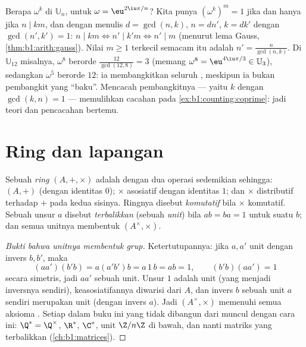 \begin{example}\label{ex:b1:structures:orderU12}
Berapa  $\omega^k$ di $\mathbb U_n$, untuk $\omega =
\eu^{2\iu\pi/n}$? Kita punya $(\omega^k)^m = 1$ jika dan hanya jika $n \mid km$, dan
dengan menulis $d = \gcd(n, k)$, $n = dn'$, $k = dk'$ dengan $\gcd(n', k')
= 1$: $n \mid km \iff n' \mid k'm \iff n' \mid m$ (menurut lema
Gauss, \cref{thm:b1:arith:gauss}). Nilai $m \geq 1$ terkecil semacam itu adalah
$n' = \frac{n}{\gcd(n,k)}$. Di $\mathbb U_{12}$ misalnya,
$\omega^8$ berorde $\frac{12}{\gcd(12,8)} = 3$ (memang
$\omega^8 = \eu^{4\iu\pi/3} \in \mathbb U_3$), sedangkan $\omega^5$
berorde $12$: ia membangkitkan seluruh , meskipun ia bukan
pembangkit yang ``baku''. Mencacah pembangkitnya --- yaitu $k$
dengan $\gcd(k, n) = 1$ --- memulihkan cacahan  pada
\cref{ex:b1:counting:coprime}: jadi teori  dan pencacahan bertemu.
\end{example}

\section{Ring dan lapangan}

\begin{definition}[Ring]\label{def:b1:structures:ring}
Sebuah \emph{ring} $(A, +, \times)$ adalah  dengan dua operasi
sedemikian sehingga: $(A, +)$  (dengan identitas $0$); $\times$
asosiatif dengan identitas $1$; dan $\times$ distributif terhadap $+$ pada
kedua sisinya. Ringnya disebut \emph{komutatif} bila $\times$ komutatif. Sebuah
unsur $a$ disebut \emph{terbalikkan} (sebuah \emph{unit}) bila $ab = ba = 1$
untuk suatu $b$; dan semua unitnya membentuk  $(A^\times, \times)$.
\end{definition}

\begin{proof}[Bukti bahwa unitnya membentuk grup]
Ketertutupannya: jika $a, a'$ unit dengan invers $b, b'$, maka
\[
(aa')(b'b) = a(a'b')b = a\,1\,b = ab = 1,
\qquad (b'b)(aa') = 1
\]
secara simetris, jadi $aa'$ sebuah unit. Unsur $1$ adalah unit (yang
menjadi inversnya sendiri), keasosiatifannya diwarisi dari $A$, dan
invers $b$ sebuah unit $a$ sendiri merupakan unit (dengan invers $a$).
Jadi $(A^\times, \times)$ memenuhi semua aksioma . Setiap 
dalam buku ini yang tidak dibangun dari  muncul dengan cara ini:
$\Q^* = \Q^\times$, $\R^*$, $\C^*$, unit $\Z/n\Z$ di bawah,
dan nanti matriks yang terbalikkan (\cref{ch:b1:matrices}).
\end{proof}

